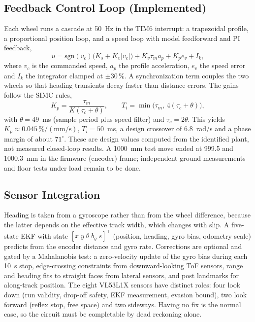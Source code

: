 \documentclass[conference]{IEEEtran}\newcommand{\haveieee}{}%
\begin{document}
\subsection{Feedback Control Loop (Implemented)}
Each wheel runs a cascade at 50~Hz in the TIM6 interrupt: a trapezoidal profile, a proportional position loop, and a speed loop with model feedforward and PI feedback,
\begin{equation}
u=\mathrm{sgn}(v_c)\bigl(K_s+K_v|v_c|\bigr)+K_v\tau_m a_p+K_p e_v+I_k,
\label{eq:law}
\end{equation}
where $v_c$ is the commanded speed, $a_p$ the profile acceleration, $e_v$ the speed error and $I_k$ the integrator clamped at $\pm30\,\%$. A synchronization term couples the two wheels so that heading transients decay faster than distance errors. The gains follow the SIMC rules,
\begin{equation}
K_p=\frac{\tau_m}{K(\tau_c+\theta)},\qquad T_i=\min\bigl(\tau_m,\,4(\tau_c+\theta)\bigr),
\label{eq:simc}
\end{equation}
with $\theta=49$~ms (sample period plus speed filter) and $\tau_c=2\theta$. This yields $K_p\approx0.045\,\%/(\mathrm{mm/s})$, $T_i=50$~ms, a design crossover of 6.8~rad/s and a phase margin of about $71^\circ$. These are design values computed from the identified plant, not measured closed-loop results. A 1000~mm test move ended at 999.5 and 1000.3~mm in the firmware (encoder) frame; independent ground measurements and floor tests under load remain to be done.

\subsection{Sensor Integration}
Heading is taken from a gyroscope rather than from the wheel difference, because the latter depends on the effective track width, which changes with slip. A five-state EKF with state $[x\;y\;\theta\;b_g\;s]^{\top}$ (position, heading, gyro bias, odometry scale) predicts from the encoder distance and gyro rate. Corrections are optional and gated by a Mahalanobis test: a zero-velocity update of the gyro bias during each 10~s stop, edge-crossing constraints from downward-looking ToF sensors, range and heading fits to straight faces from lateral sensors, and post landmarks for along-track position. The eight VL53L1X sensors have distinct roles: four look down (run validity, drop-off safety, EKF measurement, evasion bound), two look forward (reflex stop, free space) and two sideways. Having no fix is the normal case, so the circuit must be completable by dead reckoning alone.
\end{document}
